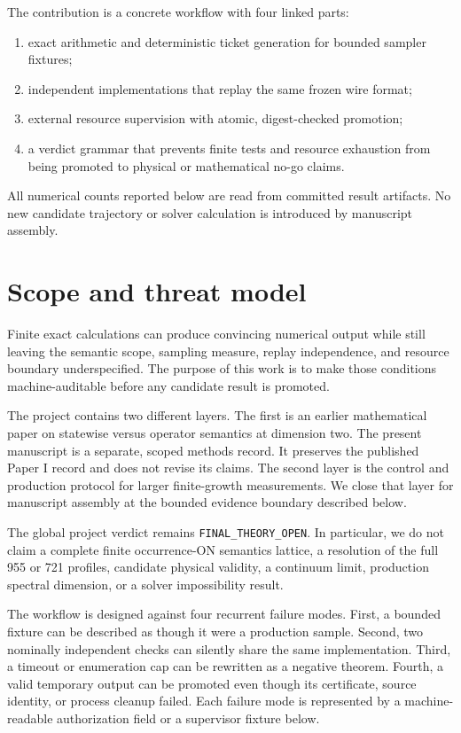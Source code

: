 \documentclass[11pt]{article}
\newcommand{\code}[1]{\texttt{#1}}
\begin{document}
The contribution is a concrete workflow with four linked parts:

\begin{enumerate}
  \item exact arithmetic and deterministic ticket generation for bounded
        sampler fixtures;
  \item independent implementations that replay the same frozen wire format;
  \item external resource supervision with atomic, digest-checked promotion;
  \item a verdict grammar that prevents finite tests and resource exhaustion
        from being promoted to physical or mathematical no-go claims.
\end{enumerate}

All numerical counts reported below are read from committed result artifacts.
No new candidate trajectory or solver calculation is introduced by manuscript
assembly.

\section{Scope and threat model}

Finite exact calculations can produce convincing numerical output while still
leaving the semantic scope, sampling measure, replay independence, and
resource boundary underspecified.  The purpose of this work is to make those
conditions machine-auditable before any candidate result is promoted.

The project contains two different layers.  The first is an earlier mathematical
paper on statewise versus operator semantics at dimension two\cite{Osaki2026PaperI}.
The present manuscript is a separate, scoped methods record.  It preserves the
published Paper I record and does not revise its claims.  The second layer is
the control and production protocol for larger finite-growth measurements.  We
close that layer for manuscript assembly at the bounded evidence boundary
described below.

The global project verdict remains \code{FINAL\_THEORY\_OPEN}.  In particular,
we do not claim a complete finite occurrence-ON semantics lattice, a resolution of the
full 955 or 721 profiles, candidate physical validity, a continuum limit,
production spectral dimension, or a solver impossibility result.

The workflow is designed against four recurrent failure modes.  First, a
bounded fixture can be described as though it were a production sample.
Second, two nominally independent checks can silently share the same
implementation.  Third, a timeout or enumeration cap can be rewritten as a
negative theorem.  Fourth, a valid temporary output can be promoted even
though its certificate, source identity, or process cleanup failed.  Each
failure mode is represented by a machine-readable authorization field or a
supervisor fixture below.
\end{document}

